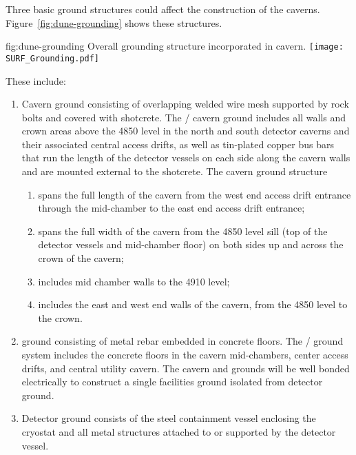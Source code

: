Three basic ground structures could affect the
construction of the caverns. Figure~\ref{fig:dune-grounding} shows these structures.
\begin{dunefigure}{fig:dune-grounding}
  {Overall  grounding structure incorporated in cavern.}
  \texttt{[image: SURF\_Grounding.pdf]}
\end{dunefigure}
These include:
\begin{enumerate}
 \item Cavern ground consisting of overlapping welded wire mesh
   supported by rock bolts and covered with shotcrete. The
   / cavern ground includes all walls and
   crown areas above the 4850 level in the north and south detector
   caverns and their associated central access drifts, as well as tin-plated
   copper bus bars that run the length of the detector vessels
   on each side along the cavern walls and are mounted external to the
   shotcrete.  The cavern ground structure
\begin{enumerate}
 \item spans the full length of the cavern from the west end access
   drift entrance through the mid-chamber to the east end access drift
   entrance;
 \item spans the full width of the cavern from the 4850 level sill
   (top of the detector vessels and mid-chamber floor) on both sides
   up and across the crown of the cavern;
 \item includes mid chamber walls to the 4910 level;
 \item includes the east and west end walls of the cavern, from the
   4850 level to the crown.
\end{enumerate}
 \item {} ground consisting of metal rebar embedded in
   concrete floors. The /  ground
   system includes the concrete floors in the cavern mid-chambers,
   center access drifts, and central utility cavern. The cavern and
    grounds will be well bonded electrically to construct
   a single facilities ground isolated from detector ground.
 \item Detector ground consists of the steel containment vessel
   enclosing the cryostat and all metal structures attached to or
   supported by the detector vessel.
\end{enumerate}


